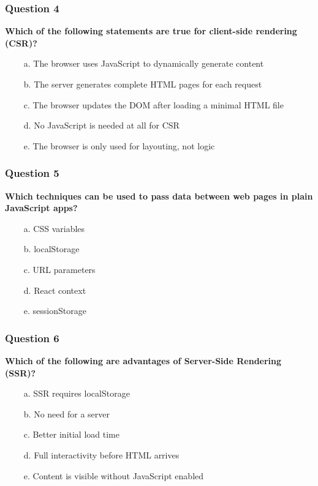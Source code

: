 \documentclass{article}
\newcommand{\cmark}{\textcolor{green}{\ding{51}}} %
\newcommand{\xmark}{\textcolor{red}{\ding{55}}}   %
\begin{document}
\subsubsection*{Question 4}
\textbf{Which of the following statements are true for client-side rendering (CSR)?}

\begin{itemize}
  \item[\cmark\ a.] The browser uses JavaScript to dynamically generate content
  \item[\xmark\ b.] The server generates complete HTML pages for each request
  \item[\cmark\ c.] The browser updates the DOM after loading a minimal HTML file
  \item[\xmark\ d.] No JavaScript is needed at all for CSR
  \item[\xmark\ e.] The browser is only used for layouting, not logic
\end{itemize}

\subsubsection*{Question 5}
\textbf{Which techniques can be used to pass data between web pages in plain JavaScript apps?}

\begin{itemize}
  \item[\xmark\ a.] CSS variables
  \item[\cmark\ b.] localStorage
  \item[\cmark\ c.] URL parameters
  \item[\xmark\ d.] React context
  \item[\cmark\ e.] sessionStorage
\end{itemize}

\subsubsection*{Question 6}
\textbf{Which of the following are advantages of Server-Side Rendering (SSR)?}

\begin{itemize}
  \item[\xmark\ a.] SSR requires localStorage
  \item[\xmark\ b.] No need for a server
  \item[\cmark\ c.] Better initial load time
  \item[\xmark\ d.] Full interactivity before HTML arrives
  \item[\cmark\ e.] Content is visible without JavaScript enabled
\end{itemize}
\end{document}
